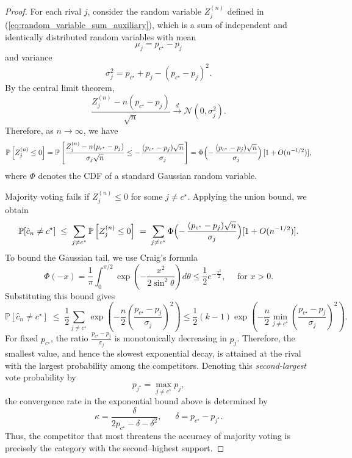 \begin{proof}
For each rival $j$, consider the random variable $Z_j^{(n)}$ defined in (\ref{eq:random_variable_sum_auxiliary}), which is a sum of independent and identically distributed random variables with mean 
$$\mu_j = p_{c^\star}-p_j$$
and variance
$$
\sigma_j^2 = p_{c^\star}+p_j - (p_{c^\star}-p_j)^2.
$$
By the central limit theorem,
$$
\frac{Z_j^{(n)}-n(p_{c^\star}-p_j)}{\sqrt{n}}\xrightarrow{d} \mathcal{N}(0,\sigma_j^2).
$$
Therefore, as $n\to \infty$, we have
\small
$$
\mathbb P\left[Z_j^{(n)}\le 0\right]
= \mathbb P\left[\frac{Z_j^{(n)}-n(p_{c^\star}-p_j)}{\sigma_j\sqrt n}
                 \le -\,\frac{(p_{c^\star}-p_j)\sqrt n}{\sigma_j}\right]
= \Phi\Bigl(-\,\frac{(p_{c^\star}-p_j)\sqrt n}{\sigma_j}\Bigr)
  \,[1+O(n^{-1/2})],
$$
\normalsize
where $\Phi$ denotes the CDF of a standard Gaussian random variable.

Majority voting fails if $Z_j^{(n)}\le 0$ for some $j \neq c^\star$.
Applying the union bound, we obtain
$$
\mathbb P[\hat{c}_n\neq c^\star]
   \;\le\;\sum_{j \neq c^\star}\mathbb P\left[Z_j^{(n)}\le 0\right]
   \;=\;\sum_{j \neq c^\star}
        \Phi\Bigl(-\,\frac{(p_{c^\star} - p_j)\sqrt n}{\sigma_j}\Bigr)
        [1+O(n^{-1/2})].
$$
To bound the Gaussian tail, we use Craig's formula
$$
\Phi(-x) = \frac{1}{\pi}\int_0^{\pi/2}\exp\left(-\frac{x^2}{2\sin^2\theta}\right)d\theta\le \frac{1}{2}e^{-\frac{x^{2}}{2}}, \quad\,\,\text{for $x>0$}.
$$
Substituting this bound gives
$$
\mathbb P[\hat{c}_n\neq c^\star]
   \;\le\;\frac{1}{2}\sum_{j \neq c^\star} \exp\left(-\frac{n}{2}\left(\frac{p_{c^\star}-p_j}{\sigma_j}\right)^2\right)\leq \frac{1}{2}(k-1) \exp\left(-\frac{n}{2}\min_{j \neq c^\star}\left(\frac{p_{c^\star}-p_j}{\sigma_j}\right)^2\right).
$$
For fixed $p_{c^\star}$, the ratio $\frac{p_{c^\star}-p_j}{\sigma_j}$ is monotonically decreasing in $p_j$. 
Therefore, the smallest value, and hence the slowest exponential decay, is attained at the rival with the largest probability among the competitors. Denoting this \emph{second-largest} vote  probability by
$$p_{j^\star} = \max_{j \neq c^\star} p_j,$$
the convergence rate in the exponential bound above is determined by 
$$
\kappa = \frac{\delta}{2 p_{c^\star} - \delta-\delta^2},\quad\,\,\ \delta = p_{c^\star}-p_{j^\star}.
$$
Thus, the competitor that most threatens the accuracy of majority voting is precisely the category with the second–highest support.


\end{proof}
